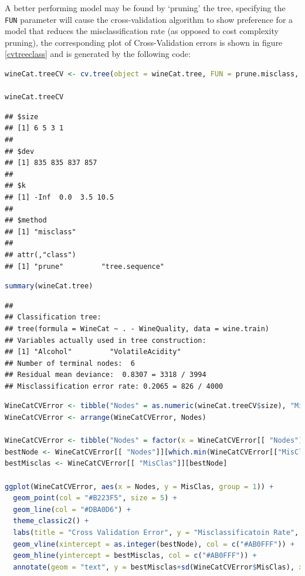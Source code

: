 \documentclass[
]{article}
\begin{document}
A better performing model may be found by `pruning' the tree, specifying the \verb|FUN| parameter will cause the cross-validation algorithm to show
preference for a model that reduces the misclassification rate (as opposed to cost complexity pruning), the corresponding plot of Cross-Validation errors is shown in figure \ref{cvtreeclass} and is generated by the following code:

\begin{lstlisting}[language=R]
wineCat.treeCV <- cv.tree(object = wineCat.tree, FUN = prune.misclass, K = 10)

wineCat.treeCV
\end{lstlisting}

\begin{lstlisting}
## $size
## [1] 6 5 3 1
## 
## $dev
## [1] 835 835 837 857
## 
## $k
## [1] -Inf  0.0  3.5 10.5
## 
## $method
## [1] "misclass"
## 
## attr(,"class")
## [1] "prune"         "tree.sequence"
\end{lstlisting}

\begin{lstlisting}[language=R]
summary(wineCat.tree)
\end{lstlisting}

\begin{lstlisting}
## 
## Classification tree:
## tree(formula = WineCat ~ . - WineQuality, data = wine.train)
## Variables actually used in tree construction:
## [1] "Alcohol"         "VolatileAcidity"
## Number of terminal nodes:  6 
## Residual mean deviance:  0.8307 = 3318 / 3994 
## Misclassification error rate: 0.2065 = 826 / 4000
\end{lstlisting}

\begin{lstlisting}[language=R]
WineCatCVError <- tibble("Nodes" = as.numeric(wineCat.treeCV$size), "MisClas" = wineCat.treeCV$dev/length(train))
WineCatCVError <- arrange(WineCatCVError, Nodes)

WineCatCVError <- tibble("Nodes" = factor(x = WineCatCVError[[ "Nodes"]], levels = WineCatCVError[[ "Nodes"]], ordered = TRUE), "MisClas" = WineCatCVError[[ "MisClas"]])
bestNode <- WineCatCVError[[ "Nodes"]][which.min(WineCatCVError[["MisClas"]])]
bestMisclas <- WineCatCVError[[ "MisClas"]][bestNode]

ggplot(WineCatCVError, aes(x = Nodes, y = MisClas, group = 1)) +
  geom_point(col = "#B223F5", size = 5) +
  geom_line(col = "#DBA0D6") +
  theme_classic2() +
  labs(title = "Cross Validation Error", y = "Misclassificatoin Rate", caption = "Misclassification Rate is a measurement of the expected frequency of misclassification as determined by Cross Validation") +
  geom_vline(xintercept = as.integer(bestNode), col = c("#AB0FFF")) +
  geom_hline(yintercept = bestMisclas, col = c("#AB0FFF")) +
  annotate(geom = "text", y = bestMisclas+sd(WineCatCVError$MisClas), x = (1.1+3), label = paste("Misclassification Rate: \n", signif(min(WineCatCVError$MisClas), 3))) 
\end{lstlisting}
\end{document}
